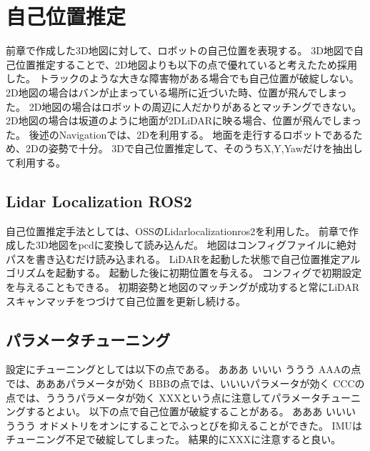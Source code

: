 \section{自己位置推定}
前章で作成した3D地図に対して、ロボットの自己位置を表現する。
3D地図で自己位置推定することで、2D地図よりも以下の点で優れていると考えたため採用した。
トラックのような大きな障害物がある場合でも自己位置が破綻しない。
2D地図の場合はバンが止まっている場所に近づいた時、位置が飛んでしまった。
2D地図の場合はロボットの周辺に人だかりがあるとマッチングできない。
2D地図の場合は坂道のように地面が2DLiDARに映る場合、位置が飛んでしまった。
後述のNavigationでは、2Dを利用する。
地面を走行するロボットであるため、2Dの姿勢で十分。
3Dで自己位置推定して、そのうちX,Y,Yawだけを抽出して利用する。
\subsection{Lidar Localization ROS2}
自己位置推定手法としては、OSSのLidarlocalizationros2を利用した。
前章で作成した3D地図をpcdに変換して読み込んだ。
地図はコンフィグファイルに絶対パスを書き込むだけ読み込まれる。
LiDARを起動した状態で自己位置推定アルゴリズムを起動する。
起動した後に初期位置を与える。
コンフィグで初期設定を与えることもできる。
初期姿勢と地図のマッチングが成功すると常にLiDARスキャンマッチをつづけて自己位置を更新し続ける。

\subsection{パラメータチューニング}
設定にチューニングとしては以下の点である。
あああ
いいい
ううう
AAAの点では、あああパラメータが効く
BBBの点では、いいいパラメータが効く
CCCの点では、うううパラメータが効く
XXXという点に注意してパラメータチューニングするとよい。
以下の点で自己位置が破綻することがある。
あああ
いいい
ううう
オドメトリをオンにすることでふっとびを抑えることができた。
IMUはチューニング不足で破綻してしまった。
結果的にXXXに注意すると良い。